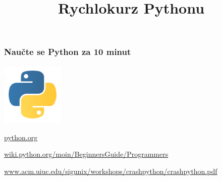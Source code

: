 \documentclass[red,handout,professionalfont]{beamer}
\title[]{Rychlokurz Pythonu}
\date[]{}
\theoremstyle{definition}
\newcommand{\0}{\mbox{${\bf 0}$}}
\begin{document}



\begin{frame}{} \titlepage
\end{frame}

\begin{frame}\frametitle{Naučte se Python za 10 minut}
 \begin{center}
  \includegraphics[width=3cm]{python_logo.png}
  
  \url{python.org}\pause
  
  \url{wiki.python.org/moin/BeginnersGuide/Programmers}\pause
  
  \url{www.acm.uiuc.edu/sigunix/workshops/crashpython/crashpython.pdf}
 \end{center}
\end{frame}
\end{document}
